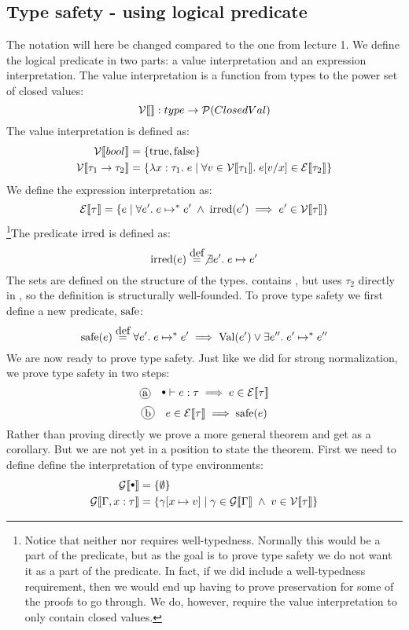 \subsection*{Type safety - using logical predicate}
The notation will here be changed compared to the one from lecture 1. We define the logical predicate in two parts: a value interpretation and an expression interpretation. The value interpretation is a function from types to the power set of closed values:
\[
  \mathcal{V}\llbracket   \rrbracket :  type \rightarrow \mathcal{P}(ClosedVal)
\]
The value interpretation is defined as:
\begin{align*}
  \mathcal{V}\llbracket bool \rrbracket & = \{ \text{true}, \text{false} \}\\
  \mathcal{V}\llbracket  \tau_1 \rightarrow \tau_2 \rrbracket & = \{\lambda x : \tau_1 . \; e \; | \; \forall v \in \mathcal{V}\llbracket \tau_1 \rrbracket.\; e [v/x] \in \mathcal{E}\llbracket \tau_2 \rrbracket\}
\end{align*}
We define the expression interpretation as:
\[
  \mathcal{E}\llbracket \tau \rrbracket = \{e \; | \; \forall e'. \; e \mapsto^{*} e' \; \wedge \; \operatorname{irred}(e') \implies e' \in \mathcal{V}\llbracket \tau \rrbracket \}
\]
\footnote{Notice that neither \vpred{\tau} nor \epred{\tau} requires well-typedness. Normally this would be a part of the predicate, but as the goal is to prove type safety we do not want it as a part of the predicate. In fact, if we did include a well-typedness requirement, then we would end up having to prove preservation for some of the proofs to go through. We do, however, require the value interpretation to only contain closed values.}The predicate $\operatorname{irred}$ is defined as:
\[
  \irred(e) \eqdef \not\exists e'. \; e \evalto e'
\]
The sets are defined on the structure of the types.  contains , but  uses $\tau_2$ directly in , so the definition is structurally well-founded. To prove type safety we first define a new predicate, $\operatorname{safe}$:
\[
  \safe(e) \eqdef \forall e' . \; e \evaltos e' \implies \val(e') \vee \exists e
''. \; e' \evaltos e''
\]
We are now ready to prove type safety. Just like we did for strong normalization, we prove type safety in two steps:
\[
  \circled{a} \quad \mtenv \vdash e : \tau \implies e \in \epred{\tau}
\]
\[
  \circled{b} \quad e \in \epred{\tau} \implies \safe(e)
\]
Rather than proving  directly we prove a more general theorem and get  as a corollary. But we are not yet in a position to state the theorem. First we need to define define the interpretation of type environments:
\begin{align*}
  \gpred{\mtenv} & = \{ \emptyset \} \\
  \gpred{\Gamma,x:\tau} & = \{\gamma[x \mapsto v] \vbar 
    \gamma \in \gpred{\Gamma} \pand 
    v \in \vpred{\tau}\}
\end{align*}
